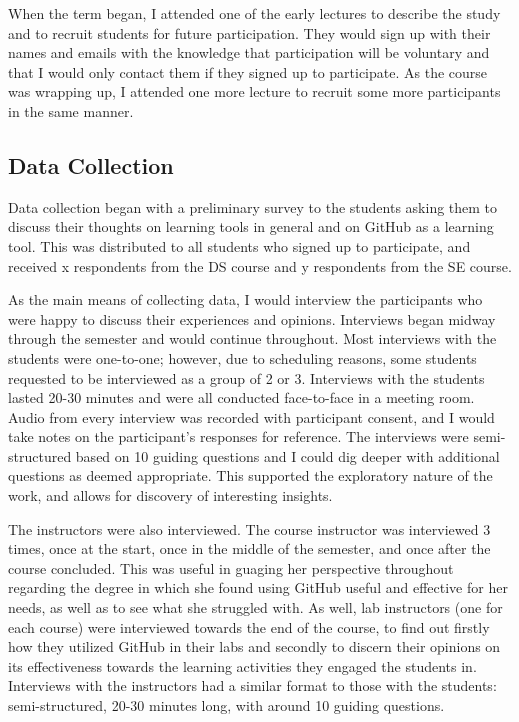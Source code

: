 When the term began, I attended one of the early lectures to describe the study and to recruit students for future participation. They would sign up with their names and emails with the knowledge that participation will be voluntary and that I would only contact them if they signed up to participate. As the course was wrapping up, I attended one more lecture to recruit some more participants in the same manner.

\subsection{Data Collection}
Data collection began with a preliminary survey to the students asking them to discuss their thoughts on learning tools in general and on GitHub as a learning tool. This was distributed to all students who signed up to participate, and received x respondents from the DS course and y respondents from the SE course.

As the main means of collecting data, I would interview the participants who were happy to discuss their experiences and opinions. Interviews began midway through the semester and would continue throughout. Most interviews with the students were one-to-one; however, due to scheduling reasons, some students requested to be interviewed as a group of 2 or 3. Interviews with the students lasted 20-30 minutes and were all conducted face-to-face in a meeting room. Audio from every interview was recorded with participant consent, and I would take notes on the participant's responses for reference. The interviews were semi-structured based on 10 guiding questions and I could dig deeper with additional questions as deemed appropriate. This supported the exploratory nature of the work, and allows for discovery of interesting insights.

The instructors were also interviewed. The course instructor was interviewed 3 times, once at the start, once in the middle of the semester, and once after the course concluded. This was useful in guaging her perspective throughout regarding the degree in which she found using GitHub useful and effective for her needs, as well as to see what she struggled with. As well, lab instructors (one for each course) were interviewed towards the end of the course, to find out firstly how they utilized GitHub in their labs and secondly to discern their opinions on its effectiveness towards the learning activities they engaged the students in. Interviews with the instructors had a similar format to those with the students: semi-structured, 20-30 minutes long, with around 10 guiding questions.

